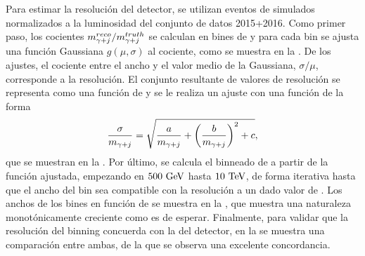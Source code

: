 Para estimar la resolución del detector, se utilizan eventos de \gammajet simulados normalizados a la luminosidad del conjunto de datos 2015+2016. Como primer paso, los cocientes \(m_{\gamma+j}^{reco} / m_{\gamma+j}^{truth}\) se calculan en bines de \myj y para cada bin se ajusta una función Gaussiana \(g(\mu, \sigma)\) al cociente, como se muestra en la \Fig{\ref{fig:results:obs:ratio_fits}}. De los ajustes, el cociente entre el ancho y el valor medio de la Gaussiana, \(\sigma / \mu\), corresponde a la resolución. El conjunto resultante de valores de resolución se representa como una función de \myj y se le realiza un ajuste con una función de la forma
\begin{equation}
    \label{eq:results:obs:binning_resolution}
    \frac{\sigma}{m_{\gamma+j}} = \sqrt{
        \frac{a}{m_{\gamma+j}} +
        \left(\frac{b}{m_{\gamma+j}}\right)^2 +
        c
    },
\end{equation}
que se muestran en la \Fig{\ref{fig:results:obs:resolution_curve}}. Por último, se calcula el binneado de \myj a partir de la función ajustada, empezando en \(500~\text{GeV}\) hasta \(10~\text{TeV}\), de forma iterativa hasta que el ancho del bin sea compatible con la resolución a un dado valor de \myj. Los anchos de los bines en función de \myj se muestra en la \Fig{\ref{fig:bkg_modeling:observable:results:binwidth}}, que muestra una naturaleza monotónicamente creciente como es de esperar. Finalmente, para validar que la resolución del binning concuerda con la del detector, en la \Fig{\ref{fig:bkg_modeling:observable:results:resolution_comparison}} se muestra una comparación entre ambas, de la que se observa una excelente concordancia.

